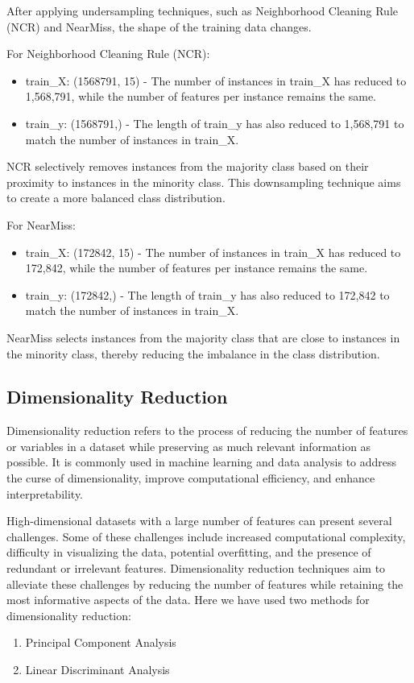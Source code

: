 \documentclass{article}
\begin{document}
After applying undersampling techniques, such as Neighborhood Cleaning Rule (NCR) and NearMiss, the shape of the training data changes.


\hspace{1cm}

For Neighborhood Cleaning Rule (NCR):

\begin{itemize}
    \item train\_X: (1568791, 15) - The number of instances in train\_X has reduced to 1,568,791, while the number of features per instance remains the same.
    \item train\_y: (1568791,) - The length of train\_y has also reduced to 1,568,791 to match the number of instances in train\_X.
\end{itemize}

NCR selectively removes instances from the majority class based on their proximity to instances in the minority class. This downsampling technique aims to create a more balanced class distribution.


\hspace{1cm}

For NearMiss:

\begin{itemize}
    \item train\_X: (172842, 15) - The number of instances in train\_X has reduced to 172,842, while the number of features per instance remains the same.
    \item train\_y: (172842,) - The length of train\_y has also reduced to 172,842 to match the number of instances in train\_X.
\end{itemize}

NearMiss selects instances from the majority class that are close to instances in the minority class, thereby reducing the imbalance in the class distribution.

\subsection{Dimensionality Reduction}
Dimensionality reduction refers to the process of reducing the number of features or variables in a dataset while preserving as much relevant information as possible. It is commonly used in machine learning and data analysis to address the curse of dimensionality, improve computational efficiency, and enhance interpretability.

High-dimensional datasets with a large number of features can present several challenges. Some of these challenges include increased computational complexity, difficulty in visualizing the data, potential overfitting, and the presence of redundant or irrelevant features. Dimensionality reduction techniques aim to alleviate these challenges by reducing the number of features while retaining the most informative aspects of the data.
Here we have used two methods for dimensionality reduction:
\begin{enumerate}
    \item Principal Component Analysis
    \item Linear Discriminant Analysis
\end{enumerate}
\end{document}
